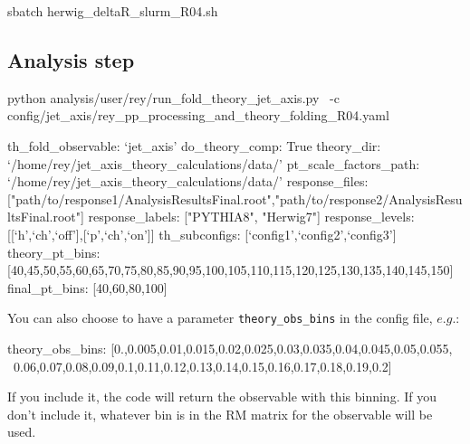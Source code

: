 \documentclass[12pt]{article}
\begin{document}
\begin{tcolorbox}
\begin{verbnobox}[\scriptsize]
sbatch herwig_deltaR_slurm_R04.sh
\end{verbnobox}  
\end{tcolorbox}

\subsection{Analysis step}

\begin{tcolorbox}
\begin{verbnobox}[\scriptsize]
python analysis/user/rey/run_fold_theory_jet_axis.py \
-c config/jet_axis/rey_pp_processing_and_theory_folding_R04.yaml
\end{verbnobox}  
\end{tcolorbox}

\begin{tcolorbox}
\begin{verbnobox}[\scriptsize]
th_fold_observable: `jet_axis'
do_theory_comp: True
theory_dir: `/home/rey/jet_axis_theory_calculations/data/'
pt_scale_factors_path: `/home/rey/jet_axis_theory_calculations/data/'
response_files: ["path/to/response1/AnalysisResultsFinal.root","path/to/response2/AnalysisResultsFinal.root"]
response_labels: ["PYTHIA8", "Herwig7"]
response_levels: [[`h',`ch',`off'],[`p',`ch',`on']]
th_subconfigs: [`config1',`config2',`config3']
theory_pt_bins: [40,45,50,55,60,65,70,75,80,85,90,95,100,105,110,115,120,125,130,135,140,145,150]
final_pt_bins: [40,60,80,100]
\end{verbnobox}
\end{tcolorbox}

You can also choose to have a parameter \verb|theory_obs_bins| in the config file, $e.g.$:

\begin{tcolorbox}
\begin{verbnobox}[\scriptsize]
theory_obs_bins: [0.,0.005,0.01,0.015,0.02,0.025,0.03,0.035,0.04,0.045,0.05,0.055, \
0.06,0.07,0.08,0.09,0.1,0.11,0.12,0.13,0.14,0.15,0.16,0.17,0.18,0.19,0.2]
\end{verbnobox}
\end{tcolorbox}
If you include it, the code will return the observable with this binning. If you don't include it,
whatever bin is in the RM matrix for the observable will be used.

\end{document}
